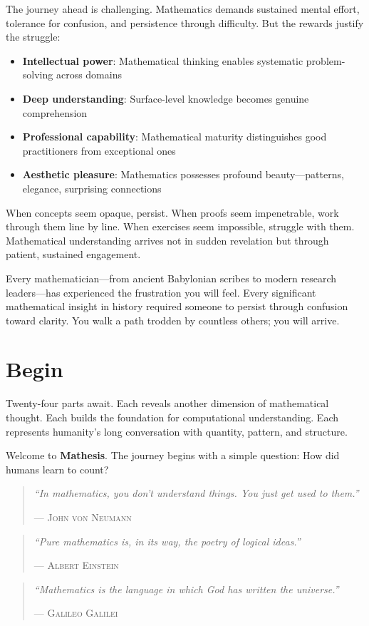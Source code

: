 The journey ahead is challenging. Mathematics demands sustained mental effort, tolerance for confusion, and persistence through difficulty. But the rewards justify the struggle:

\begin{itemize}
    \item \textbf{Intellectual power}: Mathematical thinking enables systematic problem-solving across domains
    \item \textbf{Deep understanding}: Surface-level knowledge becomes genuine comprehension
    \item \textbf{Professional capability}: Mathematical maturity distinguishes good practitioners from exceptional ones
    \item \textbf{Aesthetic pleasure}: Mathematics possesses profound beauty—patterns, elegance, surprising connections
\end{itemize}

When concepts seem opaque, persist. When proofs seem impenetrable, work through them line by line. When exercises seem impossible, struggle with them. Mathematical understanding arrives not in sudden revelation but through patient, sustained engagement.

Every mathematician—from ancient Babylonian scribes to modern research leaders—has experienced the frustration you will feel. Every significant mathematical insight in history required someone to persist through confusion toward clarity. You walk a path trodden by countless others; you will arrive.

\section*{Begin}

Twenty-four parts await. Each reveals another dimension of mathematical thought. Each builds the foundation for computational understanding. Each represents humanity's long conversation with quantity, pattern, and structure.

Welcome to \textbf{Mathesis}. The journey begins with a simple question: How did humans learn to count?

\vfill

\begin{quote}
\textit{``In mathematics, you don't understand things. You just get used to them.''}

\hfill--- \textsc{John von Neumann}
\end{quote}

\begin{quote}
\textit{``Pure mathematics is, in its way, the poetry of logical ideas.''}

\hfill--- \textsc{Albert Einstein}
\end{quote}

\begin{quote}
\textit{``Mathematics is the language in which God has written the universe.''}

\hfill--- \textsc{Galileo Galilei}
\end{quote}

\clearpage